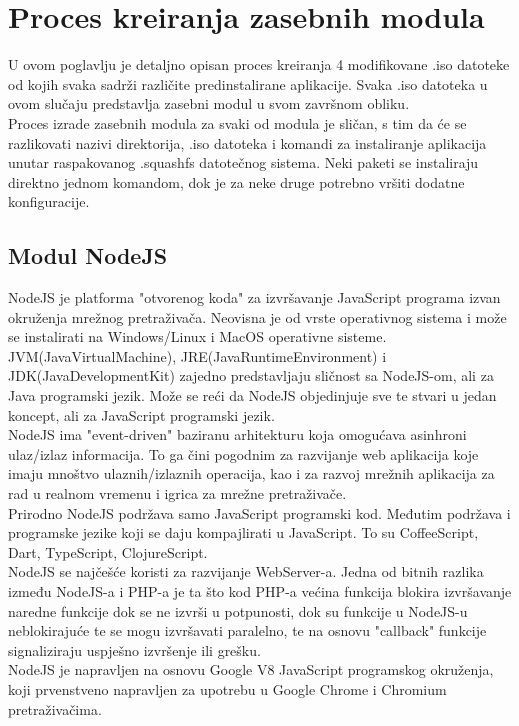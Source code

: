 \documentclass[12pt,vi]{mitthesis}
\begin{document}
\chapter*{Proces kreiranja zasebnih modula}
\indent
U ovom poglavlju je detaljno opisan proces kreiranja 4 modifikovane .iso datoteke od kojih svaka sadrži različite predinstalirane aplikacije. Svaka .iso datoteka u ovom slučaju predstavlja zasebni modul u svom završnom obliku.\\ 
Proces izrade zasebnih modula za svaki od modula je sličan, s tim da će se razlikovati nazivi direktorija, .iso datoteka i komandi za instaliranje aplikacija unutar raspakovanog .squashfs datotečnog sistema. Neki paketi se instaliraju direktno jednom komandom, dok je za neke druge potrebno vršiti dodatne konfiguracije.
\newpage
\section*{Modul NodeJS}
\indent
NodeJS\cite{nodejs-wiki} je platforma "otvorenog koda" za izvršavanje JavaScript programa izvan okruženja mrežnog pretraživača. Neovisna je od vrste operativnog sistema i može se instalirati na Windows/Linux i MacOS operativne sisteme. JVM(JavaVirtualMachine), JRE(JavaRuntimeEnvironment) i JDK(JavaDevelopmentKit) zajedno predstavljaju sličnost sa NodeJS-om, ali za Java programski jezik. Može se reći da NodeJS objedinjuje sve te stvari u jedan koncept, ali za JavaScript programski jezik.\\
NodeJS ima "event-driven" baziranu arhitekturu koja omogućava asinhroni ulaz/izlaz informacija. To ga čini pogodnim za razvijanje web aplikacija koje imaju mnoštvo ulaznih/izlaznih operacija, kao i za razvoj mrežnih aplikacija za rad u realnom vremenu i igrica za mrežne pretraživače.\\
Prirodno NodeJS podržava samo JavaScript programski kod. Međutim podržava i programske jezike koji se daju kompajlirati u JavaScript. To su CoffeeScript, Dart, TypeScript, ClojureScript.\\
NodeJS se najčešće koristi za razvijanje WebServer-a. Jedna od bitnih razlika između NodeJS-a i PHP-a je ta što kod PHP-a većina funkcija blokira izvršavanje naredne funkcije dok se ne izvrši u potpunosti, dok su funkcije u NodeJS-u neblokirajuće te se mogu izvršavati paralelno, te na osnovu "callback" funkcije signaliziraju uspješno izvršenje ili grešku.\\
NodeJS je napravljen na osnovu Google V8 JavaScript programskog okruženja, koji prvenstveno napravljen za upotrebu u Google Chrome i Chromium pretraživačima.
\end{document}
